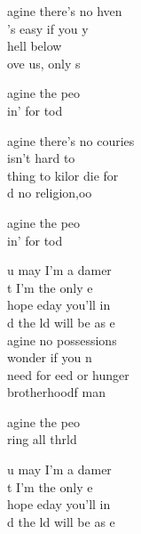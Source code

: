 \begin{cancion}%
	agine there's no hven\\
	's easy if you y\\
	 hell below \\
	ove us, only s\\
	\begin{chorus}%
	agine  the peo\\
	in' for tod\\
	\end{chorus}%
	agine there's no couries\\
	 isn't hard to \\
	thing to kilor die for\\
	d no religion,oo\\
	\begin{chorus}%
	agine  the peo\\
	in' for tod\\
	\end{chorus}%
	u may  I'm a damer \\
	t I'm  the only e  \\
	hope eday you'll in \\
	d the ld will be as e\\
	agine no possessions\\
	wonder if you n\\
	 need for eed or hunger\\
	brotherhoodf man\\
	\begin{chorus}%
	agine  the peo\\
	ring all thrld\\
	\end{chorus}%
	u may  I'm a damer \\
	t I'm  the only e  \\
	hope eday you'll in \\
	d the ld will be as e\\
\end{cancion}%
